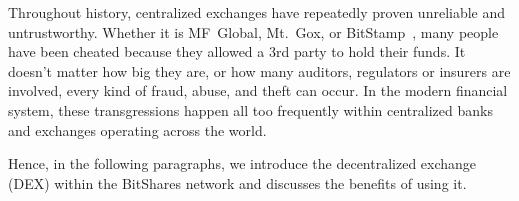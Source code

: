 \label{sec:dex}

Throughout history, centralized exchanges have repeatedly proven unreliable and
untrustworthy. Whether it is MF~Global, Mt.~Gox, or
BitStamp~\cite{mfglobal,mtgox,bitstamp}, many people have been cheated because
they allowed a 3rd party to hold their funds. It doesn't matter how big they
are, or how many auditors, regulators or insurers are involved, every kind of
fraud, abuse, and theft can occur. In the modern financial system, these
transgressions happen all too frequently within centralized banks and exchanges
operating across the world.

Hence, in the following paragraphs, we introduce the decentralized exchange
(DEX) within the BitShares network and discusses the benefits of using it.

